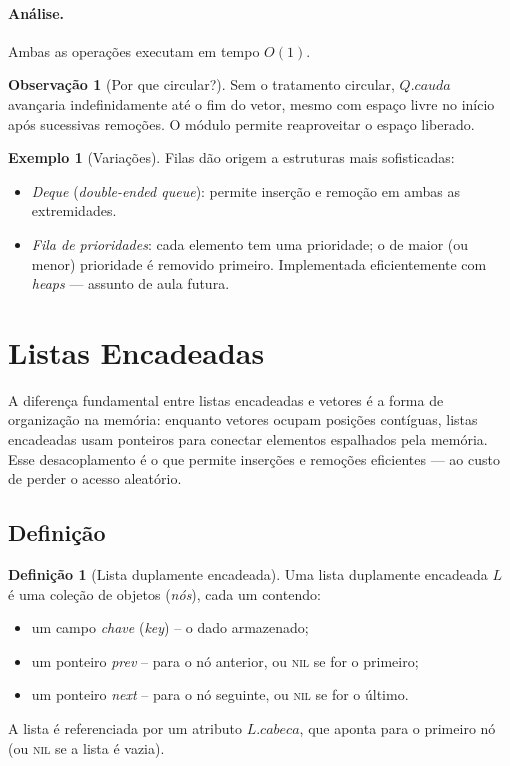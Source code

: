 \documentclass[9pt,a4paper]{extarticle}
\newcommand{\impt}[1]{\textcolor{important}{#1}}
\newcommand{\ntc}[1]{\textcolor{notice}{#1}}
\theoremstyle{definition}
\newtheorem{definition}{Definição}[section]
\newtheorem{example}{Exemplo}[section]
\newtheorem{remark}{Observação}[section]
\begin{document}
\paragraph{Análise.} Ambas as operações executam em \impt{tempo $O(1)$}.

\begin{remark}[Por que circular?]
Sem o tratamento circular, $Q.\mathit{cauda}$ avançaria indefinidamente até o fim do vetor, mesmo com espaço livre no início após sucessivas remoções. O \ntc{módulo} permite reaproveitar o espaço liberado.
\end{remark}

\begin{example}[Variações]
Filas dão origem a estruturas mais sofisticadas:
\begin{itemize}
    \item \emph{Deque} (\emph{double-ended queue}): permite inserção e remoção em ambas as extremidades.
    \item \emph{Fila de prioridades}: cada elemento tem uma prioridade; o de maior (ou menor) prioridade é removido primeiro. Implementada eficientemente com \emph{heaps} — assunto de aula futura.
\end{itemize}
\end{example}

\section{Listas Encadeadas}

A diferença fundamental entre listas encadeadas e vetores é a \impt{forma de organização na memória}: enquanto vetores ocupam posições contíguas, listas encadeadas usam \impt{ponteiros} para conectar elementos espalhados pela memória. Esse desacoplamento é o que permite inserções e remoções eficientes — ao custo de perder o acesso aleatório.

\subsection{Definição}

\begin{definition}[Lista duplamente encadeada]
Uma lista duplamente encadeada $L$ é uma coleção de objetos (\emph{nós}), cada um contendo:
\begin{itemize}
    \item um campo \emph{chave} (\emph{key}) -- o dado armazenado;
    \item um ponteiro \emph{prev} -- para o nó anterior, ou \textsc{nil} se for o primeiro;
    \item um ponteiro \emph{next} -- para o nó seguinte, ou \textsc{nil} se for o último.
\end{itemize}
A lista é referenciada por um atributo $L.\mathit{cabeca}$, que aponta para o primeiro nó (ou \textsc{nil} se a lista é vazia).
\end{definition}
\end{document}
